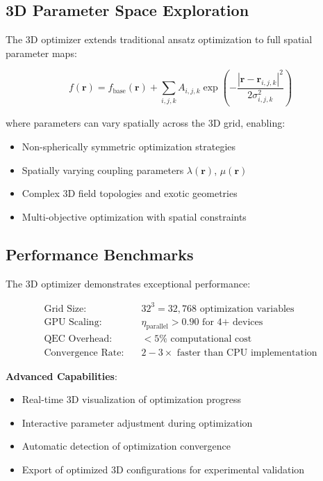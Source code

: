 \documentclass[11pt,a4paper]{article}
\begin{document}
\subsection{3D Parameter Space Exploration}

The 3D optimizer extends traditional ansatz optimization to full spatial parameter maps:

\begin{equation}
f(\mathbf{r}) = f_{\text{base}}(\mathbf{r}) + \sum_{i,j,k} A_{i,j,k} \exp\left(-\frac{|\mathbf{r} - \mathbf{r}_{i,j,k}|^2}{2\sigma_{i,j,k}^2}\right)
\end{equation}

where parameters can vary spatially across the 3D grid, enabling:
\begin{itemize}
\item Non-spherically symmetric optimization strategies
\item Spatially varying coupling parameters $\lambda(\mathbf{r})$, $\mu(\mathbf{r})$
\item Complex 3D field topologies and exotic geometries
\item Multi-objective optimization with spatial constraints
\end{itemize}

\subsection{Performance Benchmarks}

The 3D optimizer demonstrates exceptional performance:

\begin{align}
\text{Grid Size:} &\quad 32^3 = 32,768 \text{ optimization variables} \\
\text{GPU Scaling:} &\quad \eta_{\text{parallel}} > 0.90 \text{ for 4+ devices} \\
\text{QEC Overhead:} &\quad <5\% \text{ computational cost} \\
\text{Convergence Rate:} &\quad 2-3× \text{ faster than CPU implementation}
\end{align}

\textbf{Advanced Capabilities}:
\begin{itemize}
\item Real-time 3D visualization of optimization progress
\item Interactive parameter adjustment during optimization
\item Automatic detection of optimization convergence
\item Export of optimized 3D configurations for experimental validation
\end{itemize}
\end{document}
